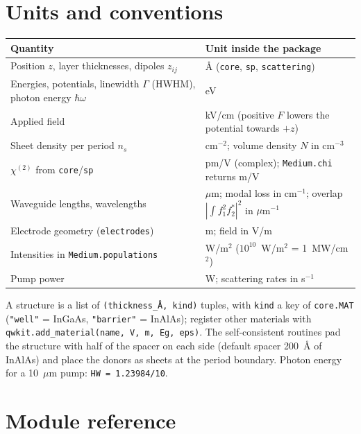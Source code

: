 \documentclass[11pt]{article}
\newcommand{\code}[1]{\texttt{#1}}
\begin{document}
\section{Units and conventions}
\begin{center}\small
\begin{tabular}{@{}ll@{}}
\toprule
Quantity & Unit inside the package \\ \midrule
Position $z$, layer thicknesses, dipoles $z_{ij}$ & \AA{} (\code{core}, \code{sp}, \code{scattering}) \\
Energies, potentials, linewidth $\Gamma$ (HWHM), photon energy $\hbar\omega$ & eV \\
Applied field & kV/cm (positive $F$ lowers the potential towards $+z$) \\
Sheet density per period $n_s$ & cm$^{-2}$; volume density $N$ in cm$^{-3}$ \\
$\chi^{(2)}$ from \code{core}/\code{sp} & pm/V (complex); \code{Medium.chi} returns m/V \\
Waveguide lengths, wavelengths & $\mu$m; modal loss in cm$^{-1}$; overlap $|\!\int f_1^2f_2^*|^2$ in $\mu$m$^{-1}$ \\
Electrode geometry (\code{electrodes}) & m; field in V/m \\
Intensities in \code{Medium.populations} & W/m$^2$ ($10^{10}$~W/m$^2$ = 1~MW/cm$^2$) \\
Pump power & W; scattering rates in s$^{-1}$ \\ \bottomrule
\end{tabular}
\end{center}
A structure is a list of \code{(thickness\_\AA, kind)} tuples, with \code{kind} a key of \code{core.MAT} (\code{"well"} = InGaAs, \code{"barrier"} = InAlAs); register other materials with \code{qwkit.add\_material(name, V, m, Eg, eps)}. The self-consistent routines pad the structure with half of the spacer on each side (default spacer 200~\AA{} of InAlAs) and place the donors as sheets at the period boundary. Photon energy for a 10~$\mu$m pump: \code{HW = 1.23984/10}.

\section{Module reference}
\end{document}
